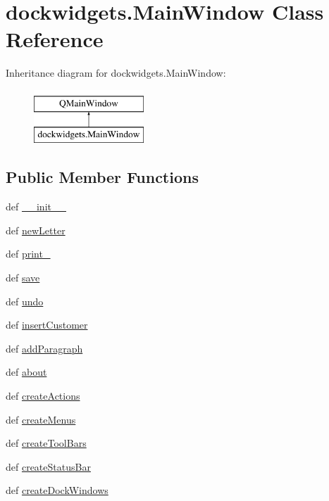 \hypertarget{classdockwidgets_1_1MainWindow}{}\section{dockwidgets.\+Main\+Window Class Reference}
\label{classdockwidgets_1_1MainWindow}
Inheritance diagram for dockwidgets.\+Main\+Window\+:\begin{figure}[H]
\begin{center}
\leavevmode
\includegraphics[height=2.000000cm]{classdockwidgets_1_1MainWindow}
\end{center}
\end{figure}
\subsection*{Public Member Functions}
\begin{DoxyCompactItemize}
\item 
def \hyperlink{classdockwidgets_1_1MainWindow_a2d7e692844b5cf4420121e413740c4a2}{\+\_\+\+\_\+init\+\_\+\+\_\+}
\item 
def \hyperlink{classdockwidgets_1_1MainWindow_a4433daf006dfb6fc9ae3bd114a50d6b6}{new\+Letter}
\item 
def \hyperlink{classdockwidgets_1_1MainWindow_a614e60763aecf96f55a12dd147dae8e3}{print\+\_\+}
\item 
def \hyperlink{classdockwidgets_1_1MainWindow_a41157bd3c8989e37ef554d91c9824b0e}{save}
\item 
def \hyperlink{classdockwidgets_1_1MainWindow_a34f09c0b70cfc4a92ff7cd32a6e95b2c}{undo}
\item 
def \hyperlink{classdockwidgets_1_1MainWindow_a116631016bc6b9146c4f7ce72921e321}{insert\+Customer}
\item 
def \hyperlink{classdockwidgets_1_1MainWindow_a3ce9c059a6c2cb444f90457a7bdde0a2}{add\+Paragraph}
\item 
def \hyperlink{classdockwidgets_1_1MainWindow_a3987b6f2968f584149cc0965b39f960d}{about}
\item 
def \hyperlink{classdockwidgets_1_1MainWindow_aa5decd4afef4553fa44a9a0fab0b8586}{create\+Actions}
\item 
def \hyperlink{classdockwidgets_1_1MainWindow_ab8fcfebeb936cff68aedddd7731f4ddd}{create\+Menus}
\item 
def \hyperlink{classdockwidgets_1_1MainWindow_aee93b13c8009686d2efd4db5c3c6c516}{create\+Tool\+Bars}
\item 
def \hyperlink{classdockwidgets_1_1MainWindow_a0917f1ca74e368d2505fc673e804e85c}{create\+Status\+Bar}
\item 
def \hyperlink{classdockwidgets_1_1MainWindow_a99e717c5fe0f5c8c786662a3e492a809}{create\+Dock\+Windows}
\end{DoxyCompactItemize}
